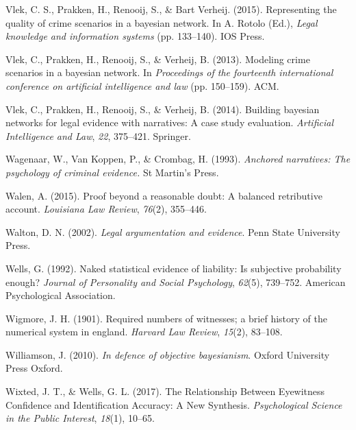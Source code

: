 \documentclass[11pt,dvipsnames,enabledeprecatedfontcommands]{scrartcl}
\begin{document}
\hypertarget{ref-vlek2015}{}
Vlek, C. S., Prakken, H., Renooij, S., \& Bart Verheij. (2015).
Representing the quality of crime scenarios in a bayesian network. In A.
Rotolo (Ed.), \emph{Legal knowledge and information systems} (pp.
133--140). IOS Press.

\hypertarget{ref-vlek2013modeling}{}
Vlek, C., Prakken, H., Renooij, S., \& Verheij, B. (2013). Modeling
crime scenarios in a bayesian network. In \emph{Proceedings of the
fourteenth international conference on artificial intelligence and law}
(pp. 150--159). ACM.

\hypertarget{ref-vlek2014building}{}
Vlek, C., Prakken, H., Renooij, S., \& Verheij, B. (2014). Building
bayesian networks for legal evidence with narratives: A case study
evaluation. \emph{Artificial Intelligence and Law}, \emph{22}, 375--421.
Springer.

\hypertarget{ref-wagenaar1993anchored}{}
Wagenaar, W., Van Koppen, P., \& Crombag, H. (1993). \emph{Anchored
narratives: The psychology of criminal evidence.} St Martin's Press.

\hypertarget{ref-walen2015}{}
Walen, A. (2015). Proof beyond a reasonable doubt: A balanced
retributive account. \emph{Louisiana Law Review}, \emph{76}(2),
355--446.

\hypertarget{ref-Walton2002}{}
Walton, D. N. (2002). \emph{Legal argumentation and evidence}. Penn
State University Press.

\hypertarget{ref-wells1992naked}{}
Wells, G. (1992). Naked statistical evidence of liability: Is subjective
probability enough? \emph{Journal of Personality and Social Psychology},
\emph{62}(5), 739--752. American Psychological Association.

\hypertarget{ref-wigmore1901number}{}
Wigmore, J. H. (1901). Required numbers of witnesses; a brief history of
the numerical system in england. \emph{Harvard Law Review},
\emph{15}(2), 83--108.

\hypertarget{ref-williamson2010defence}{}
Williamson, J. (2010). \emph{In defence of objective bayesianism}.
Oxford University Press Oxford.

\hypertarget{ref-wixted2017RelationshipEyewitnessConfidence}{}
Wixted, J. T., \& Wells, G. L. (2017). The Relationship Between
Eyewitness Confidence and Identification Accuracy: A New Synthesis.
\emph{Psychological Science in the Public Interest}, \emph{18}(1),
10--65.
\end{document}
